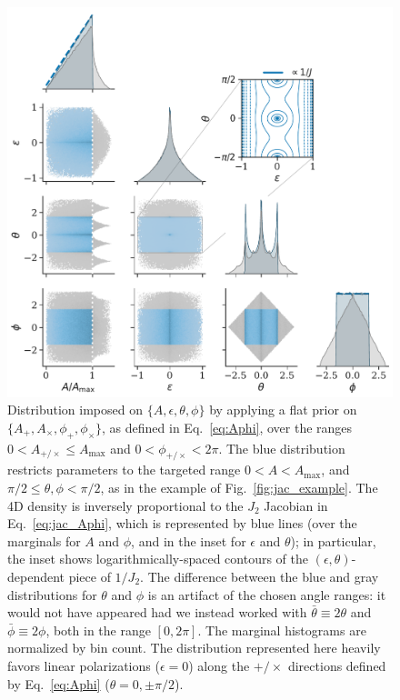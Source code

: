 \documentclass[aps,prd,twocolumn,superscriptaddress,preprintnumbers,floatfix,nofootinbib]{revtex4-2}
\newcommand*{\eq}[1]{Eq.~\eqref{eq:#1}}
\begin{document}
\begin{figure}
\includegraphics[width=\columnwidth]{jac_Aeps_Apc_corner}
\caption{Distribution imposed on $\{A,\epsilon, \theta, \phi\}$ by applying a flat prior on $\{A_+,A_\times, \phi_+, \phi_\times\}$, as defined in \eq{Aphi}, over the ranges $0 < A_{+/\times} \leq A_{\max}$ and $0 < \phi_{+/\times} < 2\pi$.
The blue distribution restricts parameters to the targeted range $0 < A < A_{\max}$, and $\pi/2 \leq \theta,\phi <\pi/2$, as in the example of Fig.~\ref{fig:jac_example}.
The 4D density is inversely proportional to the $J_2$ Jacobian in \eq{jac_Aphi}, which is represented by blue lines (over the marginals for $A$ and $\phi$, and in the inset for $\epsilon$ and $\theta$); in particular, the inset shows logarithmically-spaced contours of the $(\epsilon,\theta)$-dependent piece of $1/J_2$.
The difference between the blue and gray distributions for $\theta$ and $\phi$ is an artifact of the chosen angle ranges: it would not have appeared had we instead worked with $\bar{\theta} \equiv 2\theta$ and $\bar{\phi} \equiv 2\phi$, both in the range $[0,2\pi]$.
The marginal histograms are normalized by bin count.
The distribution represented here heavily favors linear polarizations ($\epsilon = 0$) along the $+/\times$ directions defined by \eq{Aphi} ($\theta = 0, \pm\pi/2$).
}
\label{fig:jac_Aphi}
\end{figure}
\end{document}
